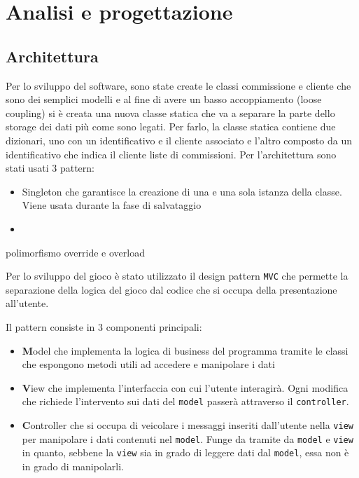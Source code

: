 \section{Analisi e progettazione}
\subsection{Architettura}

Per lo sviluppo del software, sono state create le classi commissione e cliente che sono dei semplici modelli
e al fine di avere un basso accoppiamento (loose coupling) si è creata una nuova classe statica che va a separare la parte 
dello storage dei dati più come sono legati. 
Per farlo, la classe statica contiene due dizionari, uno con un identificativo e il cliente associato e l'altro composto da
 un identificativo che indica il cliente liste di commissioni.
 \vspace{0.5cm}
 Per l'architettura sono stati usati 3 pattern:
\begin{itemize}
    \item Singleton che garantisce la creazione di una e una sola istanza della classe. Viene usata durante 
    la fase di salvataggio
    \item 
\end{itemize}

 \vspace{0.5cm}
 polimorfismo
 \vspace{0.5cm}
 override e overload
 \vspace{0.5cm}


Per lo sviluppo del gioco è stato utilizzato il design pattern \texttt{MVC} che permette la separazione della logica del gioco dal codice che si occupa della presentazione all'utente.

Il pattern consiste in 3 componenti principali:
\begin{itemize}
    \item \textbf{M}odel che implementa la logica di business del programma tramite le classi che espongono metodi utili ad accedere e manipolare i dati

    \item \textbf{V}iew che implementa l'interfaccia con cui l'utente interagirà. Ogni modifica che richiede l'intervento sui dati del \texttt{model} passerà attraverso il \texttt{controller}.

    \item \textbf{C}ontroller che si occupa di veicolare i messaggi inseriti dall'utente nella \texttt{view} per manipolare i dati contenuti nel \texttt{model}.
          Funge da tramite da \texttt{model} e \texttt{view} in quanto, sebbene la \texttt{view} sia in grado di leggere dati dal \texttt{model}, essa non è in grado di manipolarli.
\end{itemize}

